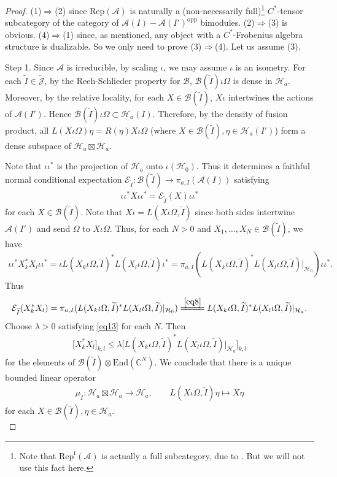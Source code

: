 \documentclass[12pt,a4paper,notitlepage]{article}
\theoremstyle{definition}
\theoremstyle{plain}
\newcommand{\mc}{\mathcal}
\newcommand{\wtd}{\widetilde}
\newcommand{\End}{\mathrm{End}} %
\newcommand{\opp}{\mathrm{opp}}
\newcommand{\Jtd}{\widetilde{\mathcal J}}
\newcommand{\RepA}{\mathrm{Rep}(\mathcal A)}
\newcommand{\RepfA}{\mathrm{Rep}^{\mathrm f}(\mathcal A)}
\newcommand{\Cbb}{\mathbb C}
\numberwithin{equation}{section}
\begin{document}
\begin{proof}
(1)$\Rightarrow$(2) since $\RepA$ is naturally a (non-necessarily full)\footnote{Note that $\RepfA$ is actually a full subcategory, due to \cite[Thm. 2.3]{GL96}. But we will not use this fact here.}  $C^*$-tensor subcategory of the category of $\mc A(I)-\mc A(I')^\opp$ bimodules. (2)$\Rightarrow$(3) is obvious. (4)$\Rightarrow$(1) since, as mentioned, any object with a $C^*$-Frobenius algebra structure is dualizable. So we only need to prove (3)$\Rightarrow$(4). Let us assume (3).

Step 1. Since $\mc A$ is irreducible, by scaling $\iota$, we may assume $\iota$ is an isometry. For each $\wtd I\in\Jtd$, by the Reeh-Schlieder property for $\mc B$,  $\mc B(\wtd I)\iota\Omega$ is dense in $\mc H_a$. Moreover, by the relative locality, for each $X\in\mc B(\wtd I)$,  $X\iota$ intertwines the actions of $\mc A(I')$. Hence $\mc B(\wtd I)\iota\Omega\subset\mc H_a(I)$.   Therefore, by the density of fusion product, all $L(X\iota\Omega)\eta=R(\eta)X\iota\Omega$ (where $X\in\mc B(\wtd I),\eta\in\mc H_a(I')$) form a dense subspace of $\mc H_a\boxtimes\mc H_a$. 

Note that $\iota\iota^*$ is the projection of $\mc H_a$ onto $\iota(\mc H_0)$. Thus it determines a faithful normal conditional expectation $\mc E_{\wtd I}:\mc B(\wtd I)\rightarrow\pi_{a,I}(\mc A(I))$ satisfying 
\begin{align*}
\iota\iota^* X\iota\iota^*=\mc E_{\wtd I}(X)\iota\iota^*	
\end{align*}
for each $X\in\mc B(\wtd I)$. Note that $X\iota=L(X\iota\Omega,\wtd I)$ since both sides intertwine $\mc A(I')$ and send $\Omega$ to $X\iota\Omega$. Thus, for each $N>0$ and $X_1,\dots,X_N\in\mc B(\wtd I)$, we have
\begin{align*}
\iota\iota^* X_k^*X_l\iota\iota^*=\iota L(X_k\iota\Omega,\wtd I)^* L(X_l\iota\Omega,\wtd I)\iota^*=\pi_{a,I}(L(X_k\iota\Omega,\wtd I)^* L(X_l\iota\Omega,\wtd I)|_{\mc H_0})\iota\iota^*.
\end{align*}
Thus
\begin{align}
\mc E_{\wtd I}(X_k^*X_l)=\pi_{a,I}(L(X_k\iota\Omega,\wtd I)^* L(X_l\iota\Omega,\wtd I)|_{\mc H_0})\xlongequal{\eqref{eq8}}L(X_k\iota\Omega,\wtd I)^* L(X_l\iota\Omega,\wtd I)|_{\mc H_a}.	
\end{align}
Choose $\lambda>0$ satisfying \eqref{eq13} for each $N$. Then
\begin{align}
\big[X_k^*X_l\big]_{k,l}\leq \lambda \big[L(X_k\iota\Omega,\wtd I)^* L(X_l\iota\Omega,\wtd I)\big|_{\mc H_a}\big]_{k,l}	
\end{align}
for the elements of $\mc B(\wtd I)\otimes\End(\Cbb^N)$. We conclude that there is a unique bounded linear operator 
\begin{align}
\mu_{\wtd I}:\mc H_a\boxtimes\mc H_a\rightarrow\mc H_a,\qquad 	L(X\iota\Omega,\wtd I)\eta\mapsto X\eta\label{eq15}
\end{align}
for each $X\in\mc B(\wtd I),\eta\in\mc H_a$. \\


\end{proof}
\end{document}
